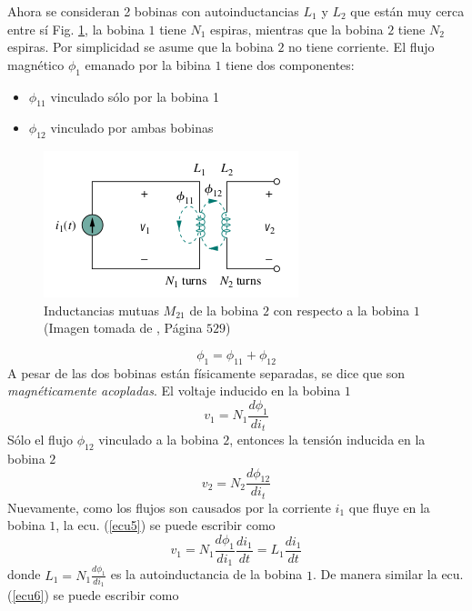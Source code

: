 \documentclass[twocolumn]{IEEEtran}
\begin{document}
Ahora se consideran 2 bobinas con autoinductancias $L_1$ y $L_2$ que están muy cerca entre sí Fig. \ref{fig2}, la bobina $1$ tiene $N_1$ espiras, mientras que la bobina $2$ tiene $N_2$ espiras. Por simplicidad se asume que la bobina $2$ no tiene corriente. El flujo magnético $\phi _1$ emanado por la bibina $1$ tiene dos componentes:
\begin{itemize}
 \item $\phi _{11}$ vinculado sólo por la bobina 1
 \item $\phi _{12}$ vinculado por ambas bobinas
\end{itemize}
\begin{figure}[H]
	\centering
		\includegraphics[scale=0.6]{2bobinas.png}
	\caption{Inductancias mutuas $M_{21}$ de la bobina $2$ con respecto a la bobina $1$ (Imagen tomada de \cite{sadiku}, Página $529$)}
	\label{fig2}
\end{figure}
\begin{equation}
 \phi _1 = \phi _{11} + \phi _{12} 
\label{ecu4}
\end{equation}
\noindent
A pesar de las dos bobinas están físicamente separadas, se dice que son \textit{magnéticamente acopladas}. El voltaje inducido en la bobina $1$
\begin{equation}
 v_1 = N_1 \frac{d \phi _1}{d i_t}
\label{ecu5}
\end{equation}
\noindent
Sólo el flujo $\phi _{12}$ vinculado a la bobina $2$, entonces la tensión inducida en la bobina $2$
\begin{equation}
 v_2 = N_2 \frac{d \phi _{12}}{d i_t}
\label{ecu6}
\end{equation}
\noindent
Nuevamente, como los flujos son causados ​​por la corriente $i_1$ que fluye en la bobina $1$, la ecu. (\ref{ecu5}) se puede escribir como
\begin{equation}
 v_1 = N_1 \frac{d \phi _1}{d i_1} \frac{d i_1}{dt} = L_1 \frac{d i_1}{d t}
\label{ecu7}
\end{equation}
\noindent
donde $L_1 = N_1\frac{d \phi _{1}}{d i_1}$ es la autoinductancia de la bobina $1$. De manera similar la ecu. (\ref{ecu6}) se puede escribir como
\end{document}
